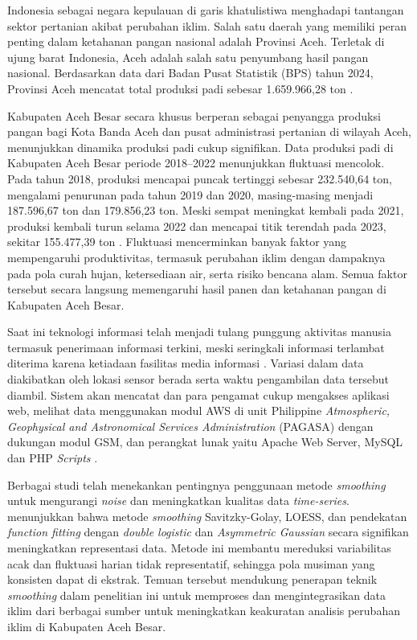     Indonesia sebagai negara kepulauan di garis khatulistiwa menghadapi tantangan sektor pertanian akibat perubahan iklim. Salah satu daerah yang memiliki peran penting dalam ketahanan pangan nasional adalah Provinsi Aceh. Terletak di ujung barat Indonesia, Aceh adalah salah satu penyumbang hasil pangan nasional. Berdasarkan data dari Badan Pusat Statistik (BPS) tahun 2024, Provinsi Aceh mencatat total produksi padi sebesar 1.659.966,28 ton \parencite{bpsindonesia2024}.

    Kabupaten Aceh Besar secara khusus berperan sebagai penyangga produksi pangan bagi Kota Banda Aceh dan pusat administrasi pertanian di wilayah Aceh, menunjukkan dinamika produksi padi cukup signifikan. Data produksi padi di Kabupaten Aceh Besar periode 2018–2022 menunjukkan fluktuasi mencolok. Pada tahun 2018, produksi mencapai puncak tertinggi sebesar 232.540,64 ton, mengalami penurunan pada tahun 2019 dan 2020, masing-masing menjadi 187.596,67 ton dan 179.856,23 ton. Meski sempat meningkat kembali pada 2021, produksi kembali turun selama 2022 dan mencapai titik terendah pada 2023, sekitar 155.477,39 ton \parencite{bpsaceh2022-2018}. Fluktuasi mencerminkan banyak faktor yang mempengaruhi produktivitas, termasuk perubahan iklim dengan dampaknya pada pola curah hujan, ketersediaan air, serta risiko bencana alam. Semua faktor tersebut secara langsung memengaruhi hasil panen dan ketahanan pangan di Kabupaten Aceh Besar.

    Saat ini teknologi informasi telah menjadi tulang punggung aktivitas manusia termasuk penerimaan informasi terkini, meski seringkali informasi terlambat diterima karena ketiadaan fasilitas media informasi \parencite{Khoirunnisa2019}. Variasi dalam data diakibatkan oleh lokasi sensor berada serta waktu pengambilan data tersebut diambil. Sistem akan mencatat dan para pengamat cukup mengakses aplikasi web, melihat data menggunakan modul AWS di unit Philippine \textit{Atmospheric, Geophysical and Astronomical Services Administration} (PAGASA) dengan dukungan modul GSM, dan perangkat lunak yaitu Apache Web Server, MySQL dan PHP \textit{Scripts} \parencite{cesar2019}.

    Berbagai studi telah menekankan pentingnya penggunaan metode \textit{smoothing} untuk mengurangi \textit{noise} dan meningkatkan kualitas data \textit{time-series}. \textcite{cai2017} menunjukkan bahwa metode \textit{smoothing} Savitzky-Golay, LOESS, dan pendekatan \textit{function fitting} dengan \textit{double logistic} dan \textit{Asymmetric Gaussian} secara signifikan meningkatkan representasi data. Metode ini membantu mereduksi variabilitas acak dan fluktuasi harian tidak representatif, sehingga pola musiman yang konsisten dapat di ekstrak. Temuan tersebut mendukung penerapan teknik \textit{smoothing} dalam penelitian ini untuk memproses dan mengintegrasikan data iklim dari berbagai sumber untuk meningkatkan keakuratan analisis perubahan iklim di Kabupaten Aceh Besar. 
    
